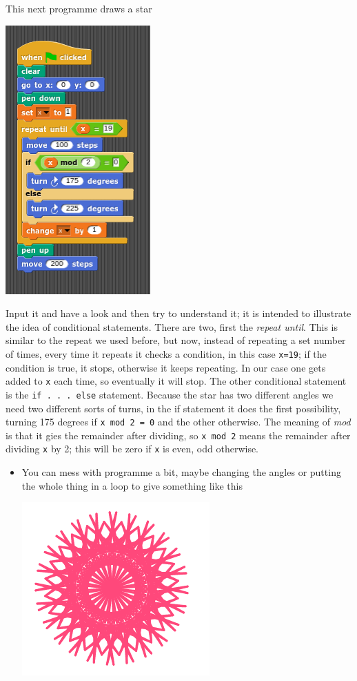 \documentclass[11pt,a4paper]{scrartcl}
\begin{document}
This next programme draws a star
\begin{center}
\includegraphics{star.png}
\end{center}
Input it and have a look and then try to understand it; it is intended
to illustrate the idea of conditional statements. There are two, first
the \textsl{repeat until}. This is similar to the repeat we used
before, but now, instead of repeating a set number of times, every
time it repeats it checks a condition, in this case \texttt{x=19}; if
the condition is true, it stops, otherwise it keeps repeating. In our
case one gets added to \texttt{x} each time, so eventually it will
stop. The other conditional statement is the \texttt{if . . . else}
statement. Because the star has two different angles we need two
different sorts of turns, in the if statement it does the first
possibility, turning 175 degrees if \texttt{x mod 2 = 0} and the other
otherwise. The meaning of \textsl{mod} is that it gies the remainder
after dividing, so \texttt{x mod 2} means the remainder after dividing
\texttt{x} by 2; this will be zero if \texttt{x} is even, odd
otherwise. 

\begin{itemize}
\item You can mess with programme a bit, maybe changing the angles or
putting the whole thing in a loop to give something like this
\begin{center}
\includegraphics{rotating_star_pic.png}
\end{center}
\end{itemize}
\end{document}

